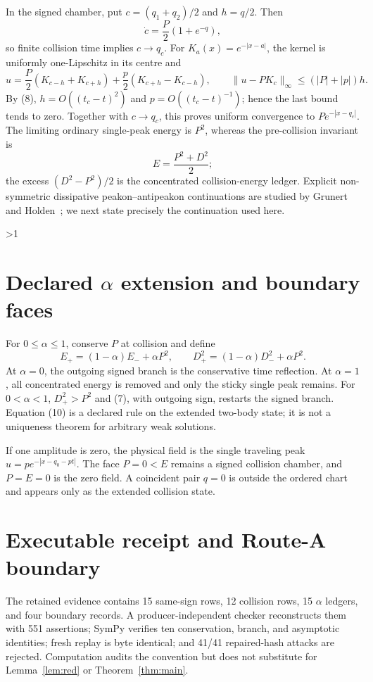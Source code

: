 \documentclass[10pt]{article}
\providecommand{\CRevisionRound}{2}
\begin{document}
In the signed chamber, put $c=(q_1+q_2)/2$ and $h=q/2$.  Then
\[
 \dot c=\frac{P}{2}(1+e^{-q}),
\]
so finite collision time implies $c\to q_c$.  For
$K_a(x)=e^{-|x-a|}$, the kernel is uniformly one-Lipschitz in its centre and
\[
 u=\frac P2(K_{c-h}+K_{c+h})
   +\frac p2(K_{c+h}-K_{c-h}),\qquad
 \lVert u-PK_c\rVert_\infty\le (|P|+|p|)h.
\]
By (8), $h=O((t_c-t)^2)$ and $p=O((t_c-t)^{-1})$; hence the last bound tends
to zero.  Together with $c\to q_c$, this proves uniform convergence to
$P e^{-|x-q_c|}$.  The limiting ordinary single-peak energy is $P^2$,
whereas the pre-collision invariant is
\[
 E=\frac{P^2+D^2}{2};
\]
the excess $(D^2-P^2)/2$ is the concentrated collision-energy ledger.
Explicit non-symmetric dissipative peakon--antipeakon continuations are
studied by Grunert and Holden~\cite{GH2016}; we next state precisely the
continuation used here.
\fi

\ifnum\CRevisionRound>1
\section{Declared \texorpdfstring{$\alpha$}{alpha} extension and boundary faces}
For $0\le\alpha\le1$, conserve $P$ at collision and define
\begin{equation}
 E_+=(1-\alpha)E_-+\alpha P^2,\qquad
 D_+^2=(1-\alpha)D_-^2+\alpha P^2.
\end{equation}
At $\alpha=0$, the outgoing signed branch is the conservative time reflection.
At $\alpha=1$, all concentrated energy is removed and only the sticky single
peak remains.  For $0<\alpha<1$, $D_+^2>P^2$ and (7), with outgoing sign,
restarts the signed branch.  Equation (10) is a declared rule on the extended
two-body state; it is not a uniqueness theorem for arbitrary weak solutions.

If one amplitude is zero, the physical field is the single traveling peak
$u=p e^{-|x-q_0-pt|}$.  The face $P=0<E$ remains a signed collision chamber,
and $P=E=0$ is the zero field.  A coincident pair $q=0$ is outside the ordered
chart and appears only as the extended collision state.

\section{Executable receipt and Route-A boundary}
The retained evidence contains 15 same-sign rows, 12 collision rows, 15
$\alpha$ ledgers, and four boundary records.  A producer-independent checker
reconstructs them with 551 assertions; SymPy verifies ten conservation,
branch, and asymptotic identities; fresh replay is byte identical; and 41/41
repaired-hash attacks are rejected.  Computation audits the convention but
does not substitute for Lemma~\ref{lem:red} or Theorem~\ref{thm:main}.
\end{document}

